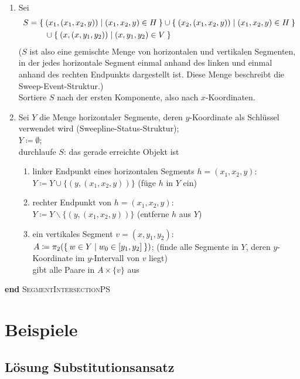 \documentclass[ngerman,draft,parskip=half*,twoside]{scrreprt}
\theoremstyle{break}
\theoremstyle{nonumberbreak}
\begin{document}
\begin{enumerate}
\item
Sei
\begin{align*}
  S &= \Set{(x_1, (x_1,x_2,y)) | (x_1,x_2,y)\in H}\cup
  \Set{(x_2,(x_1,x_2,y)) | (x_1,x_2,y)\in H}\\
  &\qquad\cup \Set{(x,(x,y_1,y_2)) | (x,y_1,y_2)\in V}
\end{align*}
($S$ ist also eine gemischte Menge von horizontalen und vertikalen Segmenten,
in der jedes horizontale Segment einmal anhand des linken und einmal
anhand des rechten Endpunkts dargestellt ist. Diese Menge beschreibt die
Sweep-Event-Struktur.)\\
Sortiere $S$ nach der ersten Komponente, also nach $x$-Koordinaten.

\item
Sei $Y$ die Menge horizontaler Segmente, deren $y$-Koordinate als
Schlüssel verwendet wird (Sweepline-Status-Struktur);\\
$Y\coloneqq\emptyset$;\\
durchlaufe $S$: das gerade erreichte Objekt ist
\begin{enumerate}
\item
linker Endpunkt eines horizontalen Segments $h=(x_1,x_2,y)$:\\
$Y \coloneqq Y \cup \{(y,(x_1,x_2,y))\}$ (füge $h$ in $Y$ ein)
\item
rechter Endpunkt von $h=(x_1,x_2,y)$:\\
$Y \coloneqq Y \backslash \{(y,(x_1,x_2,y))\}$ (entferne $h$ aus $Y$)
\item
ein vertikales Segment $v=(x,y_1,y_2)$:\\
$A \coloneqq\pi_2 (\Set{w\in Y | w_0 \in [y_1,y_2]})$;
 \hspace{1cm}  (finde alle Segmente in $Y$, deren
   $y$-Koordinate im $y$-Intervall von $v$ liegt)\\
gibt alle Paare in $A\times\{v\}$ aus
\end{enumerate}
\end{enumerate}
\textbf{end} \textsc{SegmentIntersectionPS} 

\chapter{Beispiele}
\section{Lösung Substitutionsansatz}
\label{lsg_substitutionsansatz}
\end{document}
